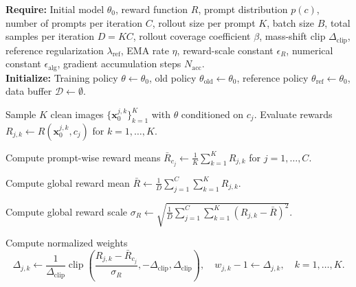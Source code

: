 \documentclass{article} %
\begin{document}
\begin{algorithm}[H]
    \caption{Single Target Loss Base Scheme }
    \label{alg:velocity-add-delete}
    \textbf{Require:} Initial model $\theta_0$, reward function $R$, prompt distribution $p(c)$, number of prompts per iteration $C$, rollout size per prompt $K$, batch size $B$, total samples per iteration $D = KC$, rollout coverage coefficient $\beta$, mass-shift clip $\Delta_{\mathrm{clip}}$, reference regularization $\lambda_{\mathrm{ref}}$, EMA rate $\eta$, reward-scale constant $\epsilon_R$, numerical constant $\epsilon_{\mathrm{alg}}$, gradient accumulation steps $N_{\mathrm{acc}}$.\\
    \textbf{Initialize:} Training policy $\theta \leftarrow \theta_0$, old policy $\theta_{\mathrm{old}} \leftarrow \theta_0$, reference policy $\theta_{\mathrm{ref}} \leftarrow \theta_0$, data buffer $\mathcal{D} \leftarrow \emptyset$.
    \begin{algorithmic}[1]
             
                \State Sample $K$ clean images $\{\mathbf{x}_0^{j,k}\}_{k=1}^{K}$ with $\theta$ conditioned on $c_j$.
                \State Evaluate rewards $R_{j,k} \leftarrow R(\mathbf{x}_0^{j,k}, c_j)$ for $k = 1, \dots, K$.
            \EndFor

            \State Compute prompt-wise reward means
            $\bar{R}_{c_j} \leftarrow \frac{1}{K}\sum_{k=1}^{K} R_{j,k}$ for $j = 1, \dots, C$.

            \State Compute global reward mean
            $\bar{R} \leftarrow \frac{1}{D}\sum_{j=1}^{C}\sum_{k=1}^{K} R_{j,k}$.

            \State Compute global reward scale
            $\sigma_R \leftarrow \sqrt{\frac{1}{D}\sum_{j=1}^{C}\sum_{k=1}^{K}(R_{j,k} - \bar{R})^2}.$

                \State Compute normalized weights
                \[
                    \Delta_{j,k} \leftarrow \frac{1}{\Delta_{\mathrm{clip}}}
                    \operatorname{clip}\!\left(
                        \frac{R_{j,k} - \bar{R}_{c_j}}{\sigma_R},
                        -\Delta_{\mathrm{clip}},
                        \Delta_{\mathrm{clip}}
                    \right),
                    \quad
                    w_{j,k}-1\leftarrow \Delta_{j,k},
                    \quad k = 1, \dots, K.
                \]


\end{algorithmic}
\end{algorithm}
\end{document}
